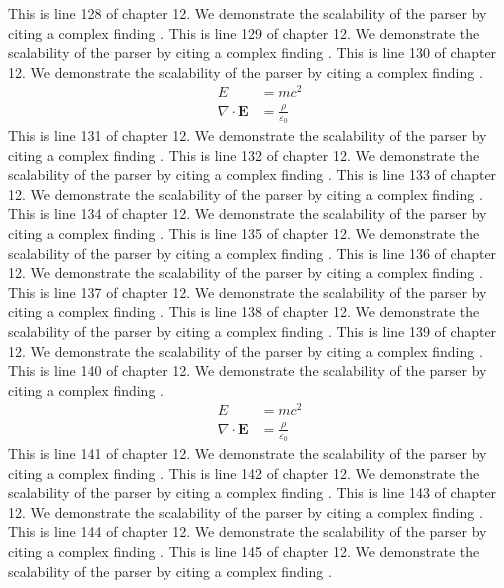 This is line 128 of chapter 12. We demonstrate the scalability of the parser by citing a complex finding \cite{ref12_128}.
This is line 129 of chapter 12. We demonstrate the scalability of the parser by citing a complex finding \cite{ref12_129}.
This is line 130 of chapter 12. We demonstrate the scalability of the parser by citing a complex finding \cite{ref12_130}.
\begin{align*}
  E &= mc^2 \\
  \nabla \cdot \mathbf{E} &= \frac{\rho}{\varepsilon_0}
\end{align*}
This is line 131 of chapter 12. We demonstrate the scalability of the parser by citing a complex finding \cite{ref12_131}.
This is line 132 of chapter 12. We demonstrate the scalability of the parser by citing a complex finding \cite{ref12_132}.
This is line 133 of chapter 12. We demonstrate the scalability of the parser by citing a complex finding \cite{ref12_133}.
This is line 134 of chapter 12. We demonstrate the scalability of the parser by citing a complex finding \cite{ref12_134}.
This is line 135 of chapter 12. We demonstrate the scalability of the parser by citing a complex finding \cite{ref12_135}.
This is line 136 of chapter 12. We demonstrate the scalability of the parser by citing a complex finding \cite{ref12_136}.
This is line 137 of chapter 12. We demonstrate the scalability of the parser by citing a complex finding \cite{ref12_137}.
This is line 138 of chapter 12. We demonstrate the scalability of the parser by citing a complex finding \cite{ref12_138}.
This is line 139 of chapter 12. We demonstrate the scalability of the parser by citing a complex finding \cite{ref12_139}.
This is line 140 of chapter 12. We demonstrate the scalability of the parser by citing a complex finding \cite{ref12_140}.
\begin{align*}
  E &= mc^2 \\
  \nabla \cdot \mathbf{E} &= \frac{\rho}{\varepsilon_0}
\end{align*}
This is line 141 of chapter 12. We demonstrate the scalability of the parser by citing a complex finding \cite{ref12_141}.
This is line 142 of chapter 12. We demonstrate the scalability of the parser by citing a complex finding \cite{ref12_142}.
This is line 143 of chapter 12. We demonstrate the scalability of the parser by citing a complex finding \cite{ref12_143}.
This is line 144 of chapter 12. We demonstrate the scalability of the parser by citing a complex finding \cite{ref12_144}.
This is line 145 of chapter 12. We demonstrate the scalability of the parser by citing a complex finding \cite{ref12_145}.
